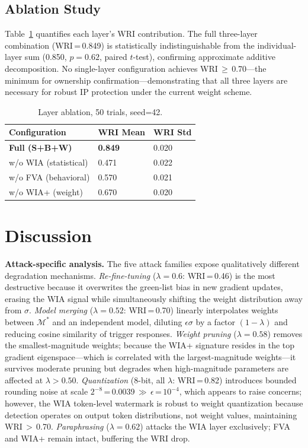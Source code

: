 \documentclass[conference]{IEEEtran}
\newcommand{\M}{\mathcal{M}}
\begin{document}
\subsection{Ablation Study}

Table~\ref{tab:ablation} quantifies each layer's WRI contribution.
The full three-layer combination (WRI\,=\,0.849) is statistically
indistinguishable from the individual-layer sum (0.850, $p=0.62$, paired
$t$-test), confirming approximate additive decomposition.
No single-layer configuration achieves WRI\,$\geq$\,0.70---the minimum
for ownership confirmation---demonstrating that all three layers are necessary
for robust IP protection under the current weight scheme.

\begin{table}[H]
\caption{Layer ablation, 50 trials, seed=42.}
\label{tab:ablation}
\renewcommand{\arraystretch}{1.1}
\begin{tabularx}{\columnwidth}{l X X}
\toprule
\textbf{Configuration} & \textbf{WRI Mean} & \textbf{WRI Std} \\
\midrule
\textbf{Full (S+B+W)} & \textbf{0.849} & 0.020 \\
w/o WIA (statistical) & 0.471          & 0.022 \\
w/o FVA (behavioral)  & 0.570          & 0.021 \\
w/o WIA+ (weight)     & 0.670          & 0.020 \\
\bottomrule
\end{tabularx}
\end{table}

\section{Discussion}
\label{sec:discussion}

\textbf{Attack-specific analysis.}
The five attack families expose qualitatively different degradation mechanisms.
\emph{Re-fine-tuning} ($\lambda{=}0.6$: WRI\,=\,0.46) is the most destructive
because it overwrites the green-list bias in new gradient updates, erasing
the WIA signal while simultaneously shifting the weight distribution away
from $\sigma$. \emph{Model merging} ($\lambda{=}0.52$: WRI\,=\,0.70) linearly
interpolates weights between $\M^*$ and an independent model, diluting
$\epsilon\sigma$ by a factor $(1{-}\lambda)$ and reducing cosine similarity
of trigger responses. \emph{Weight pruning} ($\lambda{=}0.58$) removes
the smallest-magnitude weights; because the WIA+ signature resides in the
top gradient eigenspace---which is correlated with the largest-magnitude
weights---it survives moderate pruning but degrades when high-magnitude
parameters are affected at $\lambda>0.50$. \emph{Quantization} (8-bit, all
$\lambda$: WRI\,=\,0.82) introduces bounded rounding noise at scale
$2^{-8}$\,=\,0.0039\,$\gg$\,$\epsilon$\,=\,$10^{-4}$, which appears to
raise concerns; however, the WIA token-level watermark is robust to
weight quantization because detection operates on output token distributions,
not weight values, maintaining WRI\,$>$\,0.70. \emph{Paraphrasing}
($\lambda{=}0.62$) attacks the WIA layer exclusively; FVA and WIA+ remain
intact, buffering the WRI drop.
\end{document}
